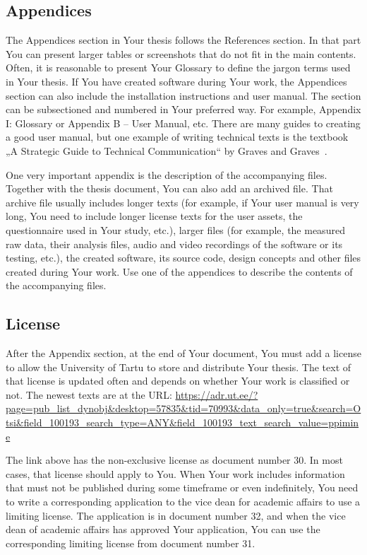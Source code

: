 \subsection{Appendices}
The Appendices section in Your thesis follows the References section. In that part You can present larger tables or screenshots that do not fit in the main contents. Often, it is reasonable to present Your Glossary to define the jargon terms used in Your thesis. If You have created software during Your work, the Appendices section can also include the installation instructions and user manual. The section can be subsectioned and numbered in Your preferred way. For example, Appendix I: Glossary or Appendix B – User Manual, etc. There are many guides to creating a good user manual, but one example of writing technical texts is the textbook „A Strategic Guide to Technical Communication“ by Graves and Graves~\cite{graves_strategic_2012}.

One very important appendix is the description of the accompanying files. Together with the thesis document, You can also add an archived file. That archive file usually includes longer texts (for example, if Your user manual is very long, You need to include longer license texts for the user assets, the questionnaire used in Your study, etc.), larger files (for example, the measured raw data, their analysis files, audio and video recordings of the software or its testing, etc.), the created software, its source code, design concepts and other files created during Your work. Use one of the appendices to describe the contents of the accompanying files.

\subsection{License} \label{subchapter:license}
After the Appendix section, at the end of Your document, You must add a license to allow the  University of Tartu to store and distribute Your thesis. The text of that license is updated often and depends on whether Your work is classified or not. The newest texts are at the URL:  \url{https://adr.ut.ee/?page=pub_list_dynobj&desktop=57835&tid=70993&data_only=true&search=Otsi&field_100193_search_type=ANY&field_100193_text_search_value=ppimine}

The link above has the non-exclusive license as document number 30. In most cases, that license should apply to You. When Your work includes information that must not be published during some timeframe or even indefinitely, You need to write a corresponding application to the vice dean for academic affairs to use a limiting license. The application is in document number 32, and when the vice dean of academic affairs has approved Your application, You can use the corresponding limiting license from document number 31.

